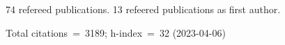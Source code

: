 74 refereed publications. 13 refeered publications as first author.

Total citations~=~3189; h-index~=~32 (2023-04-06)